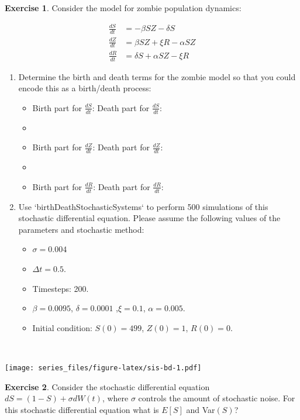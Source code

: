 \documentclass[
]{book}
\theoremstyle{definition}
\theoremstyle{definition}
\theoremstyle{definition}
\newtheorem{exercise}{Exercise}[chapter]
\theoremstyle{remark}
\begin{document}
\begin{exercise}
\protect\hypertarget{exr:unnamed-chunk-354}{}{\label{exr:unnamed-chunk-354} } Consider the model for zombie population dynamics:

\begin{align*}
\frac{dS}{dt} &=-\beta S Z - \delta S  \\
\frac{dZ}{dt} &= \beta S Z + \xi R - \alpha SZ \\
\frac{dR}{dt} &= \delta S+ \alpha SZ  - \xi R
\end{align*}

\begin{enumerate}[label=\alph*.]
\item Determine the birth and death terms for the zombie model so that you could encode this as a birth/death process:


\begin{itemize}
\item  Birth part for $\displaystyle \frac{dS}{dt}$: \hskip 2in Death part for $\displaystyle \frac{dS}{dt}$: \hfill
\item[]
\item Birth part for $\displaystyle \frac{dZ}{dt}$: \hskip 2in Death part for $ \displaystyle\frac{dZ}{dt}$: \hfill
\item[]
\item Birth part for $\displaystyle \frac{dR}{dt}$: \hskip 2in Death part for $\displaystyle \frac{dR}{dt}$: \hfill
\end{itemize}

\item Use `birthDeathStochasticSystems` to perform 500 simulations of this stochastic differential equation. Please assume the following values of the parameters and stochastic method:

\begin{itemize}
\item $\sigma = 0.004$
\item $\Delta t= 0.5$.
\item Timesteps: 200.
\item $\beta = 0.0095$, $\delta = 0.0001$ ,$\xi =  0.1$, $\alpha = 0.005$.
\item Initial condition: $S(0)=499$, $Z(0)=1$, $R(0)=0$.
\end{itemize}

\end{enumerate}
\end{exercise}

~

\texttt{[image: series\_files/figure-latex/sis-bd-1.pdf]}
~
\begin{exercise}
\protect\hypertarget{exr:unnamed-chunk-355}{}{\label{exr:unnamed-chunk-355} }Consider the stochastic differential equation \(\displaystyle dS = \left( 1 - S \right) + \sigma dW(t)\), where \(\sigma\) controls the amount of stochastic noise. For this stochastic differential equation what is \(E[S]\) and Var\((S)\)?
\end{exercise}
~
\end{document}
